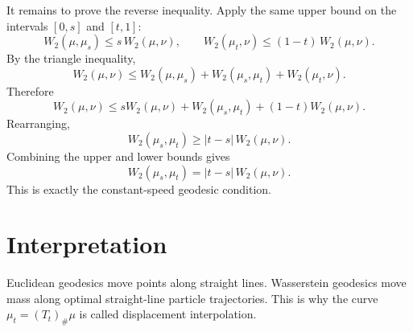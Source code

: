 \documentclass[11pt]{article}
\begin{document}
It remains to prove the reverse inequality. Apply the same upper bound on the
intervals $[0,s]$ and $[t,1]$:
\[
W_2(\mu,\mu_s)
\le
s\,W_2(\mu,\nu),
\qquad
W_2(\mu_t,\nu)
\le
(1-t)\,W_2(\mu,\nu).
\]
By the triangle inequality,
\[
W_2(\mu,\nu)
\le
W_2(\mu,\mu_s)
+
W_2(\mu_s,\mu_t)
+
W_2(\mu_t,\nu).
\]
Therefore
\[
W_2(\mu,\nu)
\le
sW_2(\mu,\nu)
+
W_2(\mu_s,\mu_t)
+
(1-t)W_2(\mu,\nu).
\]
Rearranging,
\[
W_2(\mu_s,\mu_t)
\ge
|t-s|\,W_2(\mu,\nu).
\]
Combining the upper and lower bounds gives
\[
W_2(\mu_s,\mu_t)
=
|t-s|\,W_2(\mu,\nu).
\]
This is exactly the constant-speed geodesic condition.

\section*{Interpretation}

Euclidean geodesics move points along straight lines. Wasserstein geodesics move
mass along optimal straight-line particle trajectories. This is why the curve
$\mu_t=(T_t)_\#\mu$ is called displacement interpolation.
\end{document}
